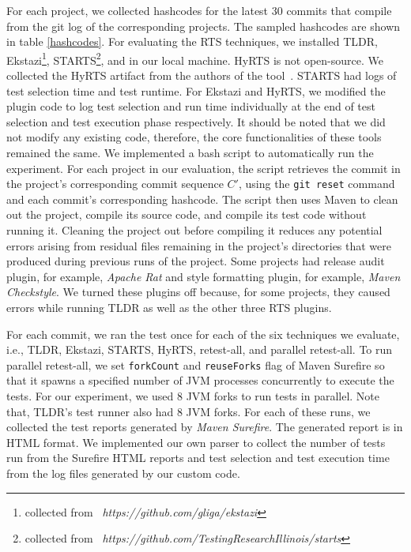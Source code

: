 For each project, we collected hashcodes for the latest 30 commits that compile from the git log of the corresponding projects. The sampled hashcodes are shown in table \ref{hashcodes}. For evaluating the RTS techniques, we installed TLDR, Ekstazi\footnote{collected from ~\textit{https://github.com/gliga/ekstazi}}, STARTS\footnote{collected from ~\textit{https://github.com/TestingResearchIllinois/starts}}, and in our local machine. HyRTS is not open-source. We collected the HyRTS artifact from the authors of the tool~\cite{hyrts}. STARTS had logs of test selection time and test runtime. For Ekstazi and HyRTS, we modified the plugin code to log test selection and run time individually at the end of test selection and test execution phase respectively. It should be noted that we did not modify any existing code, therefore, the core functionalities of these tools remained the same. We implemented a bash script to automatically run the experiment. For each project in our evaluation, the script retrieves the commit in the project's corresponding commit sequence $C'$, using the \texttt{git reset} command and each commit's corresponding hashcode. The script then uses Maven to clean out the project, compile its source code, and compile its test code without running it. Cleaning the project out before compiling it reduces any potential errors arising from residual files remaining in the project’s directories that were produced during previous runs of the project. Some projects had release audit plugin, for example, \textit{Apache Rat} and style formatting plugin, for example, \textit{Maven Checkstyle}. We turned these plugins off because, for some projects, they caused errors while running TLDR as well as the other three RTS plugins. 

For each commit, we ran the test once for each of the six techniques we evaluate, i.e., TLDR, Ekstazi, STARTS, HyRTS, retest-all, and parallel retest-all. To run parallel retest-all, we set \texttt{forkCount} and \texttt{reuseForks} flag of Maven Surefire so that it spawns a specified number of JVM processes concurrently to execute the tests. For our experiment, we used 8 JVM forks to run tests in parallel. Note that, TLDR's test runner also had 8 JVM forks. For each of these runs, we collected the test reports generated by \textit{Maven Surefire}. The generated report is in HTML format. We implemented our own parser to collect the number of tests run from the Surefire HTML reports and test selection and test execution time from the log files generated by our custom code. 

